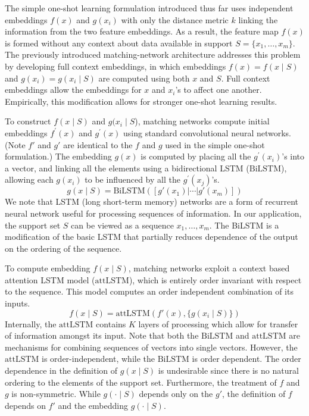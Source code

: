 The simple one-shot learning formulation introduced thus far uses independent embeddings $f(x)$ and $g(x_i)$ with only the distance metric $k$ linking the information from the two feature embeddings. As a result, the feature map $f(x)$ is formed without any context about data available in support $S = \{x_1,\dotsc, x_m\}$. The previously introduced matching-network architecture \cite{vinyals2016matching} addresses this problem by developing full context embeddings, in which embeddings $f(x)=f(x\mid S)$ and $g(x_i)=g(x_i\mid S)$ are computed using both $x$ and $S$. Full context embeddings allow the embeddings for $x$ and $x_i$'s to affect one another. Empirically, this modification allows for stronger one-shot learning results.

To construct $f(x\mid S)$ and $g(x_i\mid S$), matching networks\cite{vinyals2016matching} compute initial embeddings $f^\prime(x)$ and $g^\prime(x)$ using standard convolutional neural networks. (Note $f'$ and $g'$ are identical to the $f$ and $g$ used in the simple one-shot formulation.) The embedding $g(x)$ is computed by placing all the $g^\prime(x_i)$'s into a vector, and linking all the elements using a bidirectional LSTM \cite{hochreiter1997long, graves2013hybrid} ($\text{BiLSTM}$), allowing each $g(x_i)$ to be influenced by all the $g^\prime(x_j)$'s. 
\[
g(x\mid S) =\text{BiLSTM}([g'(x_1)|\cdots|g'(x_m)])
\]
We note that LSTM (long short-term memory) networks are a form of recurrent neural network useful for processing sequences of information. In our application, the support set $S$ can be viewed as a sequence $x_1,\dotsc, x_m$. The BiLSTM is a modification of the basic LSTM that partially reduces dependence of the output on the ordering of the sequence. 

To compute embedding $f(x\mid S)$, matching networks exploit a context based attention LSTM model \cite{vinyals2015order} ($\text{attLSTM}$), which is entirely order invariant with respect to the sequence. This model computes an order independent combination of its inputs.
\[
f(x\mid S) = \text{attLSTM}(f'(x), \{g(x_i\mid S)\})
\]
Internally, the $\text{attLSTM}$ contains $K$ layers of processing which allow for transfer of information amongst its input. Note that both the $\text{BiLSTM}$ and $\text{attLSTM}$ are mechanisms for combining sequences of vectors into single vectors. However, the $\text{attLSTM}$ is order-independent, while the $\text{BiLSTM}$ is order dependent. The order dependence in the definition of $g(x\mid S)$ is undesirable since there is no natural ordering to the elements of the support set. Furthermore, the treatment of $f$ and $g$ is non-symmetric. While $g(\cdot \mid S)$ depends only on the $g'$, the definition of $f$ depends on $f'$ and the embedding $g(\cdot \mid S)$. %


